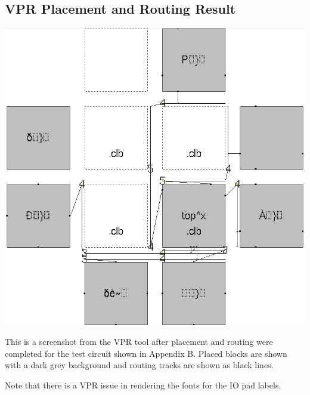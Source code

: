 \documentclass[12pt,letterpaper]{article}
\begin{document}
\begin{appendices}
\pagebreak
\section{VPR Placement and Routing Result}

\includegraphics[scale=0.5]{vpr.png}

This is a screenshot from the VPR tool after placement and routing were completed for the test circuit shown in Appendix B.
Placed blocks are shown with a dark grey background and routing tracks are shown as black lines.

Note that there is a VPR issue in rendering the fonts for the IO pad labels.




\end{appendices}
\end{document}
